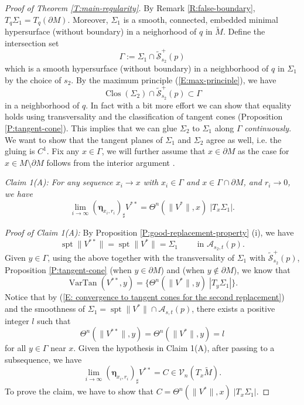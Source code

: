 \documentclass[10pt]{amsart}
\theoremstyle{definition}
\theoremstyle{remark}
\numberwithin{equation}{section}
\newcommand{\V}{\mathcal{V}}
\newcommand{\A}{\mathcal{A}}
\newcommand{\Si}{\Sigma}
\newcommand{\bleta}{\boldsymbol \eta}
\newcommand{\tM}{\widetilde{M}}
\newcommand{\tScal}{\widetilde{\mathcal{S}}}
\newcommand{\VarTan}{\operatorname{VarTan}}
\newcommand{\spt}{\operatorname{spt}}
\newcommand{\Clos}{\operatorname{Clos}}
\begin{document}
\begin{proof}[Proof of Theorem \ref{T:main-regularity}]
By Remark \ref{R:false-boundary}, $T_q \Sigma_1=T_q(\partial M)$. Moreover, $\Sigma_1$ is a smooth, connected, embedded minimal hypersurface (without boundary) in a neighorhood of $q$ in $\tM$. Define the intersection set
\begin{equation}
\label{E:Gamma-definition}
\Gamma:=\Sigma_1 \cap \tScal^+_{s_2}(p)
\end{equation}
which is a smooth hypersurface (without boundary) in a neighborhood of $q$ in $\Sigma_1$ by the choice of $s_2$. By the maximum principle (\ref{E:max-principle}), we have 
\[ \Clos(\Sigma_2) \cap \tScal^+_{s_2}(p)  \subset \Gamma \]
in a neighborhood of $q$. In fact with a bit more effort we can show that equality holds using transversality and the classification of tangent cones (Proposition \ref{P:tangent-cone}). This implies that we can glue $\Sigma_2$ to $\Sigma_1$ along $\Gamma$ \emph{continuously}. We want to show that the tangent planes of $\Sigma_1$ and $\Sigma_2$ agree as well, i.e. the gluing is $C^1$. Fix any $x \in \Gamma$, we will further assume that $x \in \partial M$ as the case for $x\in M \setminus \partial M$ follows from the interior argument \cite[(7.33)]{Schoen-Simon81}.


\vspace{.3cm}

\textit{Claim 1(A): For any sequence $x_i \to x$ with $x_i \in \Gamma$ and $x \in \Gamma\cap\partial M$, and $r_i\to 0$, we have}
\[ \lim_{i \to \infty} (\bleta_{x_i,r_i})_\sharp V^{**} = \Theta^n(\|V^*\|,x) \; |T_x \Sigma_1|.\]

\textit{Proof of Claim 1(A):}  
By Proposition \ref{P:good-replacement-property} (i), we have
\begin{equation}
\label{E:agreement-with-sigma1}
\spt \|V^{**}\| = \spt \|V^*\| =  \Si_1 \qquad \text{ in } \A_{s_2, t}(p).
\end{equation}
Given $y\in \Gamma$, using the above together with the transversality of $\Sigma_1$ with $\tScal^+_{s_2}(p)$, Proposition \ref{P:tangent-cone} (when $y\in\partial M$) and \cite[Theorem 7.8]{Pitts} (when $y\notin \partial M$), 
we know that 
\begin{equation}
\label{E: convergence to tangent cones for the second replacement}
\VarTan(V^{**}, y) = \{ \Theta^n(\|V^*\|,y ) \; |T_y \Sigma_1| \}.
\end{equation}
Notice that by (\ref{E: convergence to tangent cones for the second replacement}) and the smoothness of $\Sigma_1=\spt \|V^*\| \cap \A_{s,t}(p)$, there exists a positive integer $l$ such that
\begin{equation}
\label{E: density of V* and V**1}
\Theta^n(\|V^{**}\|, y)= \Theta^n(\|V^{*}\|, y)=l 
\end{equation}
for all $y\in\Gamma$ near $x$. 
Given the hypothesis in Claim 1(A), after passing to a subsequence, we have
\begin{equation}
\label{E: limit varifold of V** at xi}
\lim_{i \to \infty} (\bleta_{x_i,r_i})_\sharp V^{**}=C \in\V_n(T_x \tM).
\end{equation}
To prove the claim, we have to show that $C=\Theta^n(\|V^*\|,x) \; |T_x \Sigma_1|$.


\end{proof}
\end{document}
